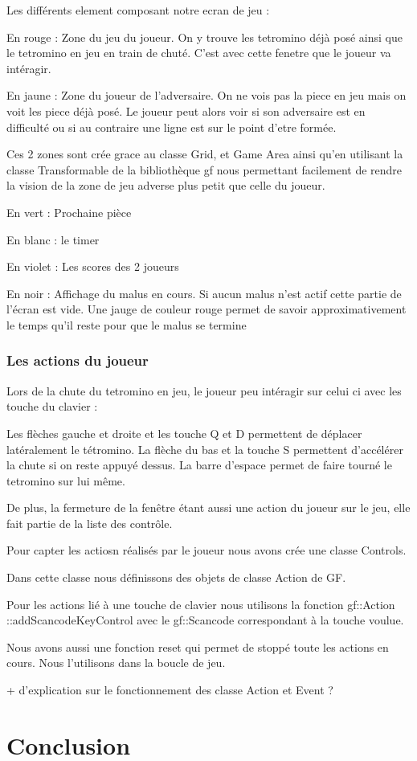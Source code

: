 \documentclass[a4paper, 12pt]{article}
\begin{document}
			Les différents element composant notre ecran de jeu : 

			En rouge : Zone du jeu du joueur. On y trouve les tetromino déjà posé ainsi que le tetromino en jeu en train de chuté. C’est avec cette fenetre que le joueur va intéragir.

			En jaune : Zone du joueur de l’adversaire. On ne vois pas la piece en jeu mais on voit les piece déjà posé. Le joueur peut alors voir si son adversaire est en difficulté ou si au contraire une ligne est sur le point d’etre formée.


			Ces 2 zones sont crée grace au classe Grid, et Game Area ainsi qu’en utilisant la classe Transformable de la bibliothèque gf nous permettant facilement de rendre la vision de la zone de jeu adverse plus petit que celle du joueur.

			En vert : Prochaine pièce

			En blanc : le timer

			En violet : Les scores des 2 joueurs

			En noir : Affichage du malus en cours. Si aucun malus n’est actif cette partie de l’écran est vide. Une jauge de couleur rouge permet de savoir approximativement le temps qu’il reste pour que le malus se termine


		\subsubsection{Les actions du joueur}

			Lors de la chute du tetromino en jeu, le joueur peu intéragir sur celui ci avec les touche du clavier :

			Les flèches gauche et droite et les touche Q et D permettent de déplacer latéralement le tétromino.
			La flèche du bas et la touche S permettent d’accélérer la chute si on reste appuyé dessus.
			La barre d’espace permet de faire tourné le tetromino sur lui même.

			De plus, la fermeture de la fenêtre étant aussi une action du joueur sur le jeu, elle fait partie de la liste des contrôle.


			Pour capter les actiosn réalisés par le joueur nous avons crée une classe Controls.

			Dans cette classe nous définissons des objets de classe Action de GF.

			Pour les actions lié à une touche de clavier nous utilisons la fonction gf::Action ::addScancodeKeyControl avec le gf::Scancode correspondant à la touche voulue.

			Nous avons aussi une fonction reset qui permet de stoppé toute les actions en cours. Nous l’utilisons dans la boucle de jeu.

			+ d’explication sur le fonctionnement des classe Action et Event ?

		
	

\section*{Conclusion}
\end{document}
